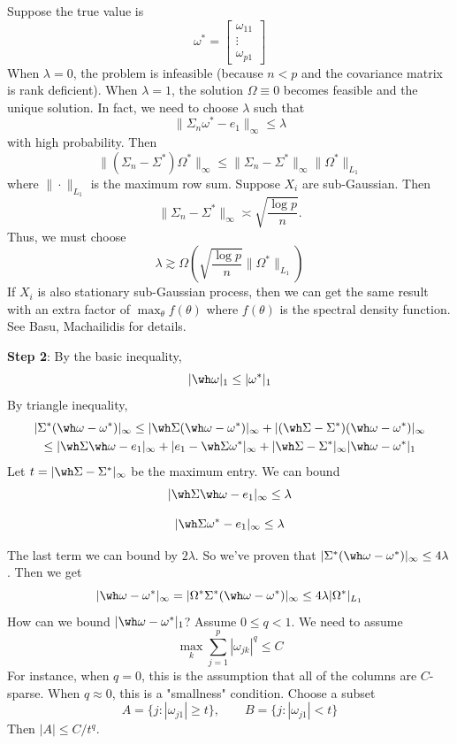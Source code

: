 Suppose the true value is
\[\omega^* =
\begin{bmatrix}
\omega_{11} \\
\vdots \\
\omega_{p1}
\end{bmatrix}\]
When \(\lambda = 0\), the problem is infeasible (because \(n < p\) and the covariance matrix is rank deficient). When \(\lambda = 1\), the solution \(\Omega \equiv 0\) becomes feasible and the unique solution. In fact, we need to choose \(\lambda\) such that
\[\|\Sigma_n \omega^* - e_1\|_\infty \leq \lambda\]
with high probability. Then
\[\|(\Sigma_n - \Sigma^*)\Omega^*\|_\infty \leq \|\Sigma_n - \Sigma^*\|_\infty \|\Omega^*\|_{L_1}\]
where \(\|\cdot\|_{L_1}\) is the maximum row sum. Suppose \(X_i\) are sub-Gaussian. Then
\[\|\Sigma_n - \Sigma^*\|_\infty \asymp \sqrt{\frac{\log p}{n}}.\]
Thus, we must choose
\[\lambda \gtrsim \Omega\left( \sqrt{\frac{\log p}{n}} \|\Omega^*\|_{L_1} \right)\]
If \(X_i\) is also stationary sub-Gaussian process, then we can get the same result with an extra factor of \(\max_\theta f(\theta)\) where \(f(\theta)\) is the spectral density function. See Basu, Machailidis for details.

\textbf{Step 2}: By the basic inequality,
\[|\wh \omega|_1 \leq |\omega^*|_1\]
By triangle inequality,
\[\begin{gathered}|\Sigma^*(\wh \omega - \omega^*)|_\infty \leq |\wh \Sigma(\wh \omega - \omega^*)|_\infty + |(\wh \Sigma - \Sigma^*)(\wh \omega - \omega^*)|_\infty \\
\leq |\wh \Sigma \wh \omega - e_1|_\infty + |e_1 - \wh \Sigma \omega^*|_\infty + |\wh \Sigma - \Sigma^*|_\infty |\wh \omega - \omega^*|_1\end{gathered}\]
Let \(t = |\wh \Sigma - \Sigma^*|_\infty\) be the maximum entry. We can bound
\[|\wh \Sigma \wh \omega - e_1|_\infty \leq \lambda\]

\[|\wh \Sigma \omega^* - e_1|_\infty \leq \lambda\]

The last term we can bound by \(2\lambda\). So we've proven that \(|\Sigma^*(\wh \omega - \omega^*)|_\infty \leq 4\lambda\). Then we get
\[|\wh \omega - \omega^*|_\infty = |\Omega^* \Sigma^*(\wh \omega - \omega^*)|_\infty \leq 4\lambda |\Omega^*|_{L_1}\]
How can we bound \(|\wh \omega - \omega^*|_1\)? Assume \(0 \leq q < 1\). We need to assume
\[\max_k \sum_{j=1}^p |\omega_{jk}|^q \leq C\]
For instance, when \(q = 0\), this is the assumption that all of the columns are \(C\)-sparse. When \(q \approx 0\), this is a "smallness" condition. Choose a subset
\[A = \{j : |\omega_{j1}| \geq t\}, \qquad B = \{j : |\omega_{j1}| < t\}\]
Then \(|A| \leq C/t^q\).


